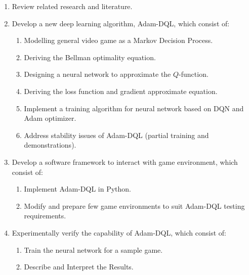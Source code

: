         \begin{enumerate}
        \item Review related research and literature.
        \item Develop a new deep learning algorithm, Adam-DQL, which consist of:
            \begin{enumerate}
            \item Modelling general video game as a Markov Decision Process.
            \item Deriving the Bellman optimality equation.
            \item Designing a neural network to approximate the $Q$-function.
            \item Deriving the loss function and gradient approximate equation.
            \item Implement a training algorithm for neural network based on DQN and Adam optimizer. 
            \item Address stability issues of Adam-DQL (partial training and demonstrations).
            \end{enumerate}
        
        \item Develop a software framework to interact with game environment, which consist of:
            \begin{enumerate}
            \item Implement Adam-DQL in Python.
            \item Modify and prepare few game environments to suit Adam-DQL testing requirements.
            \end{enumerate}
        
        \item Experimentally verify the capability of Adam-DQL, which consist of:
            \begin{enumerate}
            \item Train the neural network for a sample game.
            \item Describe and Interpret the Results.
            \end{enumerate}
        \end{enumerate}
        
   
		

